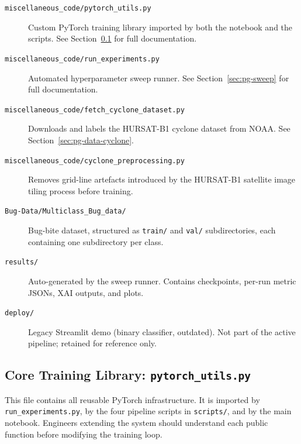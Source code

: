 \documentclass[12pt,a4paper]{article}
\begin{document}
\begin{description}
    \item[\texttt{miscellaneous\_code/pytorch\_utils.py}]
          Custom PyTorch training library imported by both the notebook and the
          scripts. See Section~\ref{sec:pg-pytorch-utils} for full documentation.

    \item[\texttt{miscellaneous\_code/run\_experiments.py}]
          Automated hyperparameter sweep runner. See
          Section~\ref{sec:pg-sweep} for full documentation.

    \item[\texttt{miscellaneous\_code/fetch\_cyclone\_dataset.py}]
          Downloads and labels the HURSAT-B1 cyclone dataset from NOAA.
          See Section~\ref{sec:pg-data-cyclone}.

    \item[\texttt{miscellaneous\_code/cyclone\_preprocessing.py}]
          Removes grid-line artefacts introduced by the HURSAT-B1 satellite
          image tiling process before training.

    \item[\texttt{Bug-Data/Multiclass\_Bug\_data/}]
          Bug-bite dataset, structured as \texttt{train/} and \texttt{val/}
          subdirectories, each containing one subdirectory per class.

    \item[\texttt{results/}]
          Auto-generated by the sweep runner. Contains checkpoints, per-run
          metric JSONs, XAI outputs, and plots.

    \item[\texttt{deploy/}]
          Legacy Streamlit demo (binary classifier, outdated). Not part of
          the active pipeline; retained for reference only.
\end{description}

\subsection{Core Training Library: \texttt{pytorch\_utils.py}}
\label{sec:pg-pytorch-utils}

This file contains all reusable PyTorch infrastructure. It is imported by
\texttt{run\_experiments.py}, by the four pipeline scripts in \texttt{scripts/},
and by the main notebook. Engineers extending the system should understand each
public function before modifying the training loop.
\end{document}
